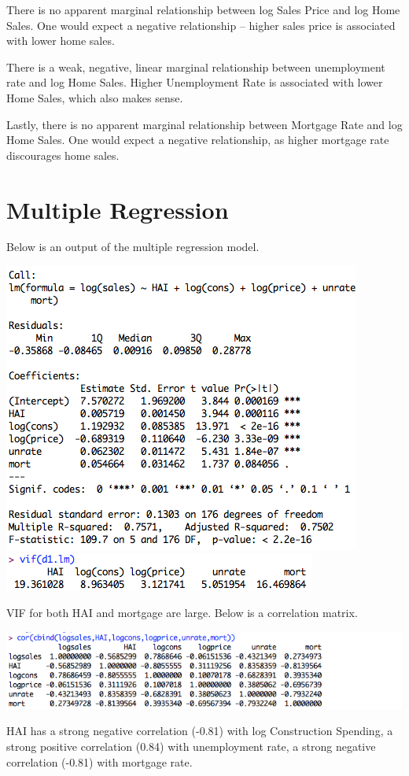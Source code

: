 \documentclass[a4 paper, 11 pt]{article}
\begin{document}
There is no apparent marginal relationship between log Sales Price and log Home Sales. One would expect a negative relationship -- higher sales price is associated with lower home sales.

There is a weak, negative, linear marginal relationship between unemployment rate and log Home Sales. Higher Unemployment Rate is associated with lower Home Sales, which also makes sense.

Lastly, there is no apparent marginal relationship between Mortgage Rate and log Home Sales. One would expect a negative relationship, as higher mortgage rate discourages home sales.

\section{Multiple Regression}
Below is an output of the multiple regression model.
\begin{center}
\includegraphics[scale=0.5]{reg} \\
\includegraphics[scale=0.5]{vif}
\end{center}
VIF for both HAI and mortgage are large. Below is a correlation matrix.
\begin{center}
\includegraphics[scale=0.5]{matrix}
\end{center}
HAI has a strong negative correlation (-0.81) with log Construction Spending, a strong positive correlation (0.84) with unemployment rate, a strong negative correlation (-0.81) with mortgage rate.
\end{document}
